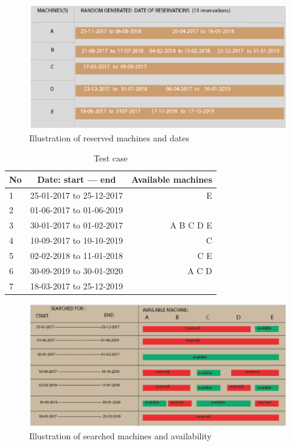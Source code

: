 \begin{figure}
\includegraphics[width=\linewidth]{randreserve1.eps}
\caption{Illustration of reserved machines and dates}
\label{randreserve1}
\end{figure}

\begin{table}[h!]
  \centering
  \label{tab:table1}
  \begin{tabular}{l|c||r}
    No & Date: start --- end & Available machines\\
    \hline
    1 &25-01-2017 to 25-12-2017  & E \\
    2 &01-06-2017 to 01-06-2019  & \\
    3 &30-01-2017 to 01-02-2017  & A B C D E \\
    4 &10-09-2017 to 10-10-2019  & C \\
    5 &02-02-2018 to 11-01-2018  & C E \\
    6 &30-09-2019 to 30-01-2020  & A C D\\
    7 &18-03-2017 to 25-12-2019  & \\
  \end{tabular}
  \caption{Test case}
\end{table}

\begin{figure}
\includegraphics[width=\linewidth]{randreserve.eps}
\caption{Illustration of searched machines and availability }
\label{randreserve}
\end{figure}

